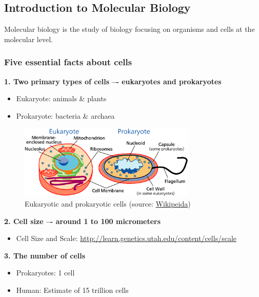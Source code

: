 %
%

%
%
\setcounter{figure}{0}
\makeatletter 
\renewcommand{\thefigure}{\arabic{section}.\arabic{figure}}
\makeatother
\subsection{Introduction to Molecular Biology}
Molecular biology is the study of biology focusing on organisms and cells at the molecular level.

%
%
\subsubsection*{Five essential facts about cells}

\textbf{1. Two primary types of cells –- eukaryotes and prokaryotes}
\begin{itemize}
\item Eukaryote: animals \& plants
\item Prokaryote: bacteria \& archaea
\end{itemize}
\begin{figure}[H]
  \centering
      \includegraphics[width=0.75\textwidth]{fig01/prokaryote_and_eukaryote_cells.png}
  \caption{Eukaryotic and prokaryotic cells (source: \href{https://commons.wikimedia.org/wiki/File:Celltypes.svg}{Wikipeida})}
\end{figure}

\noindent \textbf{2. Cell size –- around 1 to 100 micrometers}
\begin{itemize}
\item Cell Size and Scale: \url{http://learn.genetics.utah.edu/content/cells/scale}
\end{itemize}
\medskip  

\noindent \textbf{3. The number of cells}
\begin{itemize}
\item Prokaryotes: 1 cell
\item Human:  Estimate of 15 trillion cells
\end{itemize}
\medskip 

